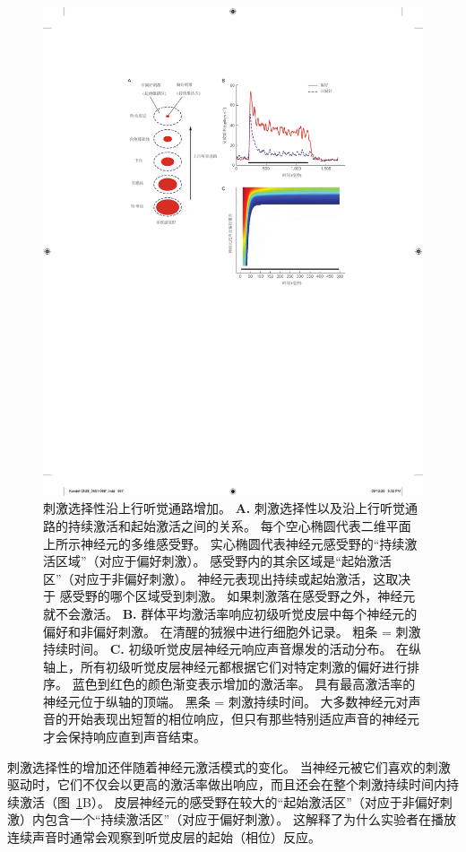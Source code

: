 \begin{figure}[htbp]
	\centering
	\includegraphics[width=0.8\linewidth]{chap28/fig_28_9}
	\caption{刺激选择性沿上行听觉通路增加。
		\textbf{A.} 刺激选择性以及沿上行听觉通路的持续激活和起始激活之间的关系。
		每个空心椭圆代表二维平面上所示神经元的多维感受野。
		实心椭圆代表神经元感受野的“持续激活区域”（对应于偏好刺激）。
		感受野内的其余区域是“起始激活区”（对应于非偏好刺激）。
		神经元表现出持续或起始激活，这取决于 感受野的哪个区域受到刺激。
		如果刺激落在感受野之外，神经元就不会激活\cite{wang2018cortical}。
		\textbf{B.} 群体平均激活率响应初级听觉皮层中每个神经元的偏好和非偏好刺激。
		在清醒的狨猴中进行细胞外记录。
		粗条 = 刺激持续时间\cite{wang2005sustained}。
		\textbf{C.} 初级听觉皮层神经元响应声音爆发的活动分布。
		在纵轴上，所有初级听觉皮层神经元都根据它们对特定刺激的偏好进行排序。
		蓝色到红色的颜色渐变表示增加的激活率。
		具有最高激活率的神经元位于纵轴的顶端。
		黑条 = 刺激持续时间。
		大多数神经元对声音的开始表现出短暂的相位响应，但只有那些特别适应声音的神经元才会保持响应直到声音结束\cite{middlebrooks2005auditory}。 }
	\label{fig:28_9}
\end{figure}


刺激选择性的增加还伴随着神经元激活模式的变化。
当神经元被它们喜欢的刺激驱动时，它们不仅会以更高的激活率做出响应，而且还会在整个刺激持续时间内持续激活（图~\ref{fig:28_9}B）。
皮层神经元的感受野在较大的“起始激活区”（对应于非偏好刺激）内包含一个“持续激活区”（对应于偏好刺激）。 
这解释了为什么实验者在播放连续声音时通常会观察到听觉皮层的起始（相位）反应。


